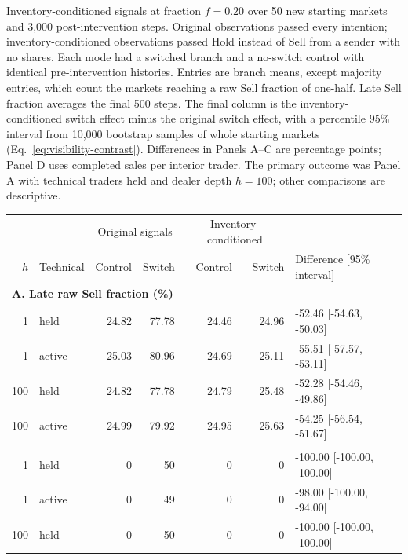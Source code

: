 \clearpage
\begin{center}
\begin{minipage}{\linewidth}\centering
\captionsetup{type=table,hypcap=false}
\caption{Inventory-conditioned signals at fraction $f=0.20$ over 50 new
starting markets and 3,000 post-intervention steps. Original observations
passed every intention; inventory-conditioned observations passed Hold
instead of Sell from a sender with no shares. Each mode had a switched
branch and a no-switch control with identical pre-intervention histories.
Entries are branch means, except majority entries, which count the
markets reaching a raw Sell fraction of one-half. Late Sell fraction
averages the final 500 steps. The final column is the inventory-conditioned
switch effect minus the original switch effect, with a percentile 95\%
interval from 10,000 bootstrap samples of whole starting markets
(Eq.~\ref{eq:visibility-contrast}). Differences in Panels A--C are
percentage points; Panel D uses completed sales per interior trader.
The primary outcome was Panel A with technical traders held and dealer
depth $h=100$; other comparisons are descriptive.}
\label{tab:visibility}
\small\setlength{\tabcolsep}{3pt}
\begin{tabular}{rlrrrrl}
\toprule
& & \multicolumn{2}{c}{Original signals} & \multicolumn{2}{c}{Inventory-conditioned} & \\
$h$ & Technical & Control & Switch & Control & Switch & Difference [95\% interval]\\
\midrule
\multicolumn{7}{l}{\textbf{A. Late raw Sell fraction (\%)}} \\
1 & held & 24.82 & 77.78 & 24.46 & 24.96 & -52.46 [-54.63, -50.03] \\
1 & active & 25.03 & 80.96 & 24.69 & 25.11 & -55.51 [-57.57, -53.11] \\
100 & held & 24.82 & 77.78 & 24.79 & 25.48 & -52.28 [-54.46, -49.86] \\
100 & active & 24.99 & 79.92 & 24.95 & 25.63 & -54.25 [-56.54, -51.67] \\
\addlinespace
\multicolumn{7}{l}{\textbf{B. Markets reaching a Sell majority (out of 50)}} \\
1 & held & 0 & 50 & 0 & 0 & -100.00 [-100.00, -100.00] \\
1 & active & 0 & 49 & 0 & 0 & -98.00 [-100.00, -94.00] \\
100 & held & 0 & 50 & 0 & 0 & -100.00 [-100.00, -100.00] \\

\end{tabular}
\end{minipage}
\end{center}
